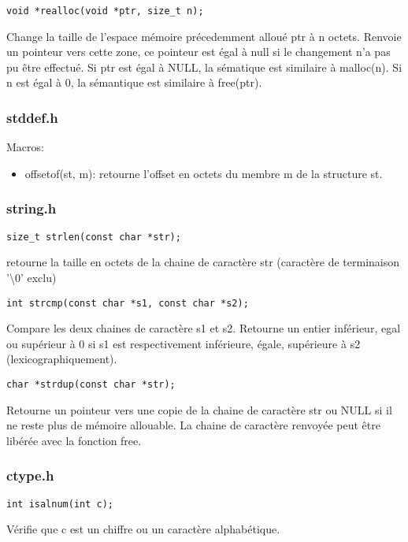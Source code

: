 \documentclass{article}
\begin{document}
\begin{verbatim}
void *realloc(void *ptr, size_t n);
\end{verbatim}
Change la taille de l'espace mémoire précedemment alloué ptr à n octets.
Renvoie un pointeur vers cette zone, ce pointeur est égal à null si le changement
n'a pas pu être effectué.  Si ptr est égal à NULL, la sématique est similaire à malloc(n).
Si n est égal à 0, la sémantique est similaire à free(ptr).

\subsubsection{stddef.h}
Macros:
\begin{itemize}
\item offsetof(st, m): retourne l'offset en octets du membre m de la structure st.
\end{itemize}
\subsubsection{string.h}

\begin{verbatim}
size_t strlen(const char *str);
\end{verbatim}
retourne la taille en octets de la chaine de caractère str (caractère de terminaison '\textbackslash 0' exclu)

\begin{verbatim}
int strcmp(const char *s1, const char *s2);
\end{verbatim}
Compare les deux chaines de caractère s1 et s2.  Retourne un entier inférieur, egal ou supérieur à 0 si s1 est
respectivement inférieure, égale, supérieure à s2 (lexicographiquement).

\begin{verbatim}
char *strdup(const char *str);
\end{verbatim}
Retourne un pointeur vers une copie de la chaine de caractère str ou NULL si il ne reste plus de mémoire allouable.
La chaine de caractère renvoyée peut être libérée avec la fonction free.
\subsubsection{ctype.h}

\begin{verbatim}
int isalnum(int c);
\end{verbatim}
Vérifie que c est un chiffre ou un caractère alphabétique.
\end{document}
